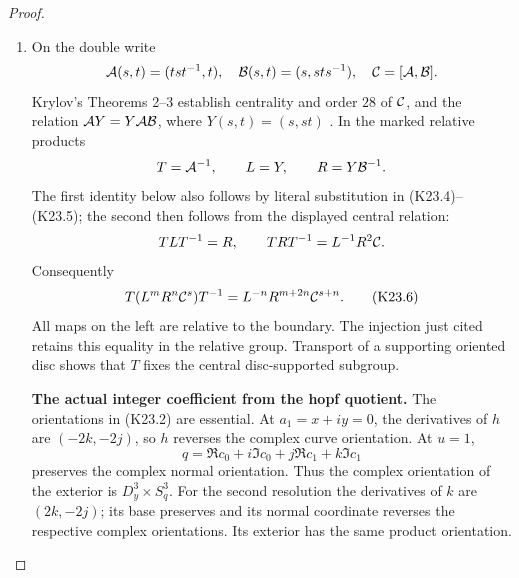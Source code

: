 \begin{proof}
\begin{enumerate}[label=\arabic*.]
\par\medskip\noindent\textbf{Exact relative generators and conjugation.}\enspace
Choose a smooth degree-one map
\(\zeta:(D^3,S^2)\to(S^3,1)\), constant on a boundary collar,
which is equivariant for quaternionic conjugation and commutes
with \(y\). Explicitly one can use
\[
 \zeta(y)=\cos\phi(|y|)-\sin\phi(|y|)\frac{y}{|y|},
\]
where \(\phi\) decreases from \(\pi\) to zero, has the smooth odd
radial expansion at zero, and is flat near the boundary. Define
\[
 L(y,q)=(y,\zeta(y)q),\qquad R(y,q)=(y,q\zeta(y)).
                                                        \tag{K23.5}
\]
They commute and extend over \(D^3\times D^4\) by the same quaternion
multiplications. Their induced six-sphere classes are therefore zero.
They represent the left and right generators of
\(\pi_3SO(4)=\mathbb Z^2\). Extension by the identity to the double
injects the relative pseudo-isotopy group into the doubled group;
Krylov's Proposition 1 and Lemma 3 give, in this dimension, the
relative group \(\Theta _7\oplus\mathbb Z^2\)
\cite{Krylov2004}. Pseudo-isotopy is sufficient here, since extending
the resulting collar gives the same oriented sphere gluing.

\item On the double write
\[
 {\cal A}(s,t)=(tst^{-1},t),\quad
 {\cal B}(s,t)=(s,sts^{-1}),\quad
 {\cal C}=[{\cal A},{\cal B}].
\]
Krylov's Theorems 2--3 establish centrality and order \(28\) of
\({\cal C}\), and the relation
\({\cal A}Y=Y{\cal A}{\cal B}\), where \(Y(s,t)=(s,st)\)
\cite{Krylov2001}. In the marked relative products
\[
       T={\cal A}^{-1},\qquad L=Y,\qquad
       R=Y{\cal B}^{-1}.
\]
The first identity below also follows by literal substitution in
(K23.4)--(K23.5); the second then follows from the displayed central
relation:
\[
 TLT^{-1}=R,\qquad
 TRT^{-1}=L^{-1}R^2{\cal C}.
\]
Consequently
\[
 T(L^mR^n{\cal C}^s)T^{-1}
       =L^{-n}R^{m+2n}{\cal C}^{s+n}.                \tag{K23.6}
\]
All maps on the left are relative to the boundary. The injection
just cited retains this equality in the relative group. Transport
of a supporting oriented disc shows that \(T\) fixes the central
disc-supported subgroup.

\par\medskip\noindent\textbf{The actual integer coefficient from the hopf quotient.}\enspace
The orientations in (K23.2) are essential. At \(a_1=x+iy=0\),
the derivatives of \(h\) are \((-2k,-2j)\), so \(h\) reverses the
complex curve orientation. At \(u=1\),
\[
 q=\Re c_0+i\Im c_0+j\Re c_1+k\Im c_1
\]
preserves the complex normal orientation. Thus the complex
orientation of the exterior is \(D^3_y\times S^3_q\).
For the second resolution the derivatives of \(k\) are \((2k,-2j)\);
its base preserves and its normal coordinate reverses the respective
complex orientations. Its exterior has the same product orientation.


\end{enumerate}
\end{proof}
